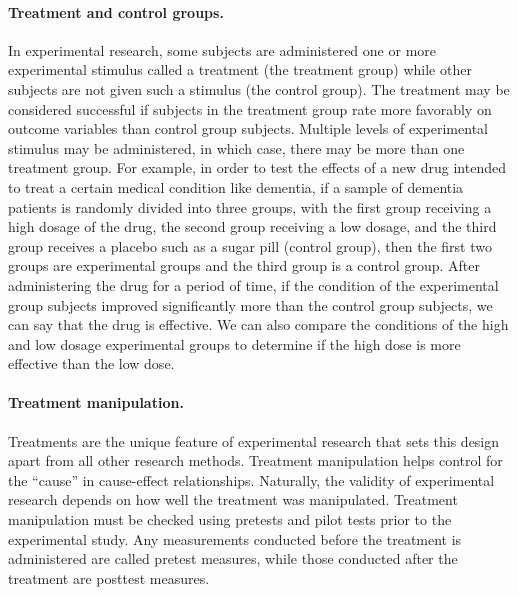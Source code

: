 \paragraph{Treatment and control groups.} In experimental research, some subjects are administered one or more experimental stimulus called a treatment (the treatment group) while other subjects are not given such a stimulus (the control group). The treatment may be considered successful if subjects in the treatment group rate more favorably on outcome variables than control group subjects. Multiple levels of experimental stimulus may be administered, in which case, there may be more than one treatment group. For example, in order to test the effects of a new drug intended to treat a certain medical condition like dementia, if a sample of dementia patients is randomly divided into three groups, with the first group receiving a high dosage of the drug, the second group receiving a low dosage, and the third group receives a placebo such as a sugar pill (control group), then the first two groups are experimental groups and the third group is a control group. After administering the drug for a period of time, if the condition of the experimental group subjects improved significantly more than the control group subjects, we can say that the drug is effective. We can also compare the conditions of the high and low dosage experimental groups to determine if the high dose is more effective than the low dose.

\paragraph{Treatment manipulation.} Treatments are the unique feature of experimental research that sets this design apart from all other research methods. Treatment manipulation helps control for the “cause” in cause-effect relationships. Naturally, the validity of experimental research depends on how well the treatment was manipulated. Treatment manipulation must be checked using pretests and pilot tests prior to the experimental study. Any measurements conducted before the treatment is administered are called pretest measures, while those conducted after the treatment are posttest measures. 


